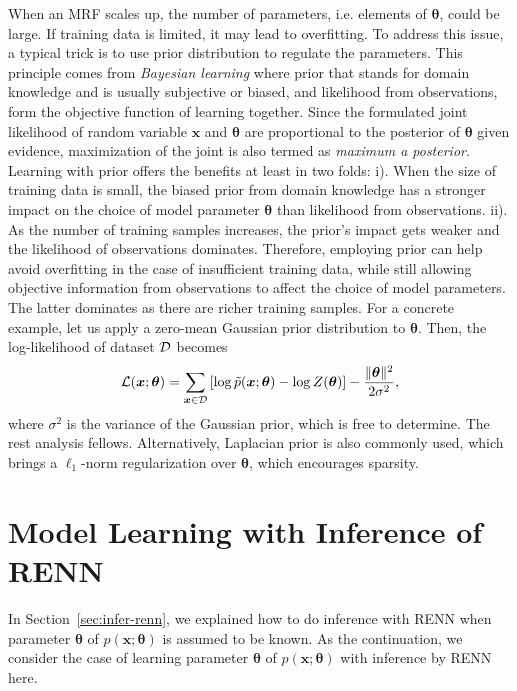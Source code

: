 \begin{remark}
  When an MRF scales up, the number of parameters, i.e. elements of $\bm{\theta}$, could be large. If training data is limited, it may lead to overfitting. To address this issue, a typical trick is to use prior distribution to regulate the parameters. This principle comes from \textit{Bayesian learning} where prior that stands for domain knowledge and is usually subjective or biased, and likelihood from observations, form the objective function of learning together. Since the formulated joint likelihood of random variable $\bm{x}$ and $\bm{\theta}$ are proportional to the posterior of $\bm{\theta}$ given evidence, maximization of the joint is also termed as \textit{maximum a posterior}. Learning with prior offers the benefits at least in two folds: i). When the size of training data is small, the biased prior from domain knowledge has a stronger impact on the choice of model parameter $\bm{\theta}$ than likelihood from observations. ii). As the number of training samples increases, the prior's impact gets weaker and the likelihood of observations dominates. Therefore, employing prior can help avoid overfitting in the case of insufficient training data, while still allowing objective information from observations to affect the choice of model parameters. The latter dominates as there are richer training samples. For a concrete example, let us apply a zero-mean Gaussian prior distribution to $\bm{\theta}$. Then, the log-likelihood of dataset $\mathcal{D}$ becomes 
  \begin{equation}
    \mathcal{L}(\bm{x};\bm{\theta}) = \sum_{\bm{x}\in \mathcal{D}}\left[ \log{\tilde{p}(\bm{x}; \bm{\theta})} - \log{Z(\bm{\theta})}  \right] - \frac{\| \bm{\theta} \|^2}{2\sigma^2},
  \end{equation}
  where $\sigma^2$ is the variance of the Gaussian prior, which is free to determine. The rest analysis fellows.
Alternatively, Laplacian prior is also commonly used, which brings a $\ell_1$-norm regularization over $\bm{\theta}$, which encourages sparsity.

\end{remark}


\section{Model Learning with Inference of RENN}
\label{sec:model-learning-with-renn}
In Section~\ref{sec:infer-renn}, we explained how to do inference with RENN when parameter $\bm{\theta}$ of $p(\bm{x}; \bm{\theta})$ is assumed to be known. As the continuation, we consider the case of learning parameter $\bm{\theta}$ of $p(\bm{x}; \bm{\theta})$ with inference by RENN here.

